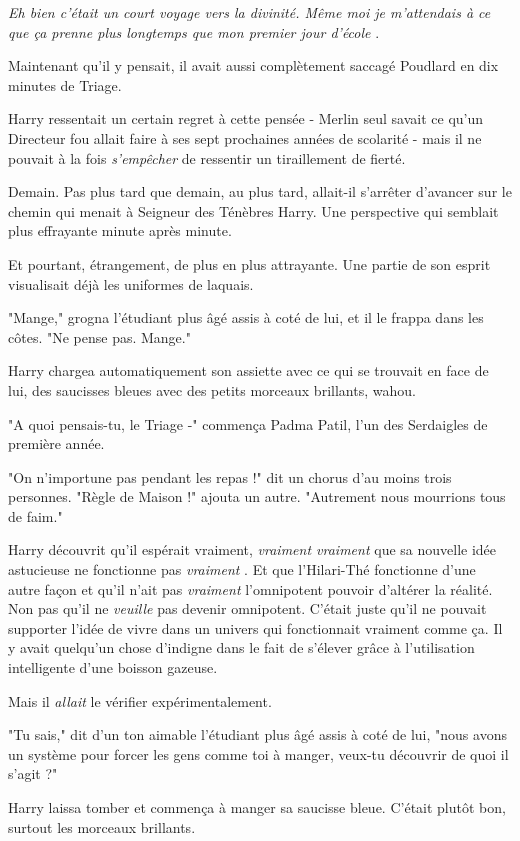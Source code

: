 \emph{Eh bien c'était un court voyage vers la divinité. Même moi je m'attendais à ce que ça prenne plus longtemps que mon premier jour d'école} .

Maintenant qu'il y pensait, il avait aussi complètement saccagé Poudlard en dix minutes de Triage.

Harry ressentait un certain regret à cette pensée - Merlin seul savait ce qu'un Directeur fou allait faire à ses sept prochaines années de scolarité - mais il ne pouvait à la fois \emph{s'empêcher}  de ressentir un tiraillement de fierté.

Demain. Pas plus tard que demain, au plus tard, allait-il s'arrêter d'avancer sur le chemin qui menait à Seigneur des Ténèbres Harry. Une perspective qui semblait plus effrayante minute après minute.

Et pourtant, étrangement, de plus en plus attrayante. Une partie de son esprit visualisait déjà les uniformes de laquais.

"Mange," grogna l'étudiant plus âgé assis à coté de lui, et il le frappa dans les côtes. "Ne pense pas. Mange."

Harry chargea automatiquement son assiette avec ce qui se trouvait en face de lui, des saucisses bleues avec des petits morceaux brillants, wahou.

"A quoi pensais-tu, le Triage -" commença Padma Patil, l'un des Serdaigles de première année.

"On n'importune pas pendant les repas !" dit un chorus d'au moins trois personnes. "Règle de Maison !" ajouta un autre. "Autrement nous mourrions tous de faim."

Harry découvrit qu'il espérait vraiment, \emph{vraiment vraiment}  que sa nouvelle idée astucieuse ne fonctionne pas \emph{vraiment} . Et que l'Hilari-Thé fonctionne d'une autre façon et qu'il n'ait pas \emph{vraiment}  l'omnipotent pouvoir d'altérer la réalité. Non pas qu'il ne \emph{veuille}  pas devenir omnipotent. C'était juste qu'il ne pouvait supporter l'idée de vivre dans un univers qui fonctionnait vraiment comme ça. Il y avait quelqu'un chose d'indigne dans le fait de s'élever grâce à l'utilisation intelligente d'une boisson gazeuse.

Mais il \emph{allait}  le vérifier expérimentalement.

"Tu sais," dit d'un ton aimable l'étudiant plus âgé assis à coté de lui, "nous avons un système pour forcer les gens comme toi à manger, veux-tu découvrir de quoi il s'agit ?"

Harry laissa tomber et commença à manger sa saucisse bleue. C'était plutôt bon, surtout les morceaux brillants.

